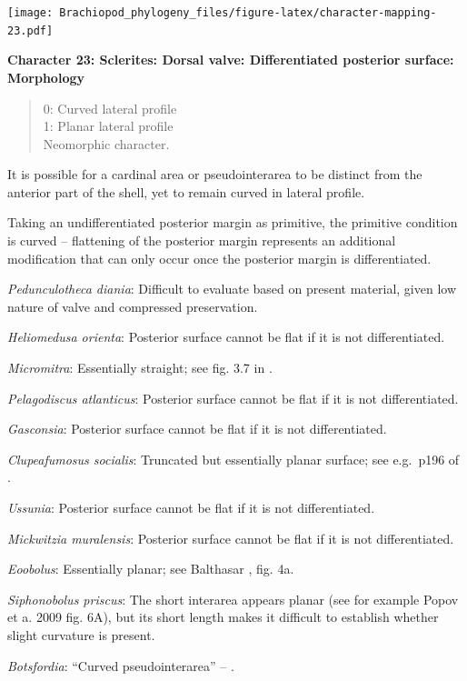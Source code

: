 \documentclass[]{book}
\theoremstyle{definition}
\theoremstyle{definition}
\theoremstyle{definition}
\theoremstyle{remark}
\begin{document}
\texttt{[image: Brachiopod\_phylogeny\_files/figure-latex/character-mapping-23.pdf]}

\textbf{Character 23: Sclerites: Dorsal valve: Differentiated posterior
surface: Morphology}

\begin{quote}
0: Curved lateral profile\\
1: Planar lateral profile\\
Neomorphic character.
\end{quote}

It is possible for a cardinal area or pseudointerarea to be distinct
from the anterior part of the shell, yet to remain curved in lateral
profile.

Taking an undifferentiated posterior margin as primitive, the primitive
condition is curved -- flattening of the posterior margin represents an
additional modification that can only occur once the posterior margin is
differentiated.

\emph{Pedunculotheca diania}: Difficult to evaluate based on present
material, given low nature of valve and compressed preservation.

\emph{Heliomedusa orienta}: Posterior surface cannot be flat if it is
not differentiated.

\emph{Micromitra}: Essentially straight; see fig. 3.7 in
\citet{Ushatinskaya2016Protegulumand}.

\emph{Pelagodiscus atlanticus}: Posterior surface cannot be flat if it
is not differentiated.

\emph{Gasconsia}: Posterior surface cannot be flat if it is not
differentiated.

\emph{Clupeafumosus socialis}: Truncated but essentially planar surface;
see e.g.~p196 of \citet{Topper2013Reappraisalof}.

\emph{Ussunia}: Posterior surface cannot be flat if it is not
differentiated.

\emph{Mickwitzia muralensis}: Posterior surface cannot be flat if it is
not differentiated.

\emph{Eoobolus}: Essentially planar; see Balthasar
\citeyearpar{Balthasar2009Thebrachiopod}, fig. 4a.

\emph{Siphonobolus priscus}: The short interarea appears planar (see for
example Popov et a. 2009 fig. 6A), but its short length makes it
difficult to establish whether slight curvature is present.

\emph{Botsfordia}: ``Curved pseudointerarea'' --
\citet{Skovsted2017Depthrelated}.
\end{document}
